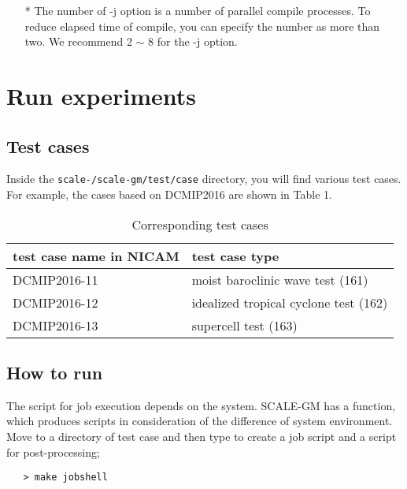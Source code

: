 \begin{itemize}
  \item[*] The number of -j option is a number of parallel compile processes.
   To reduce elapsed time of compile, you can specify the number
   as more than two. We recommend 2 $\sim$ 8 for the -j option.
\end{itemize}

\section{Run experiments}
\subsection{Test cases}

\noindent Inside the \texttt{scale-{\version}/scale-gm/test/case} directory, you will find various test cases.
For example, the cases based on DCMIP2016 are shown in Table 1.

 \begin{table}[b]
 \begin{center}
 \caption{Corresponding test cases}
 \begin{tabularx}{150mm}{|l|X|} \hline
 \rowcolor[gray]{0.9} test case name in NICAM & test case type \\ \hline
  DCMIP2016-11 & moist baroclinic wave test (161)       \\ \hline
  DCMIP2016-12 & idealized tropical cyclone test (162)  \\ \hline
  DCMIP2016-13 & supercell test (163)                   \\ \hline
 \end{tabularx}
 \end{center}
 \end{table}


\subsection{How to run}

The script for job execution depends on the system.
SCALE-GM has a function, which produces scripts in consideration
of the difference of system environment.
Move to a directory of test case and then type
to create a job script and a script for post-processing;

 \begin{verbatim}
   > make jobshell
 \end{verbatim}

